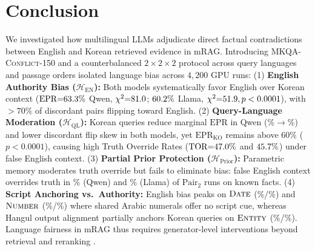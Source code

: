 \section{Conclusion}
\label{sec:conclusion}

We investigated how multilingual LLMs adjudicate direct factual contradictions between English and Korean retrieved evidence in mRAG. Introducing \textsc{MKQA-Conflict-150} and a counterbalanced $2 \times 2 \times 2$ protocol across query languages and passage orders isolated language bias across $4{,}200$ GPU runs: (1) \textbf{English Authority Bias ($\mathcal{H}_{\text{EN}}$):} Both models systematically favor English over Korean context ($\text{EPR}{=}63.3\%$ Qwen, $\chi^2{=}81.0$; $60.2\%$ Llama, $\chi^2{=}51.9, p <0.0001$), with $>70\%$ of discordant pairs flipping toward English. (2) \textbf{Query-Language Moderation ($\mathcal{H}_{\text{QL}}$):} Korean queries reduce marginal $\text{EPR}$ in Qwen (\qwenEPREN\%$\to$\qwenEPRKO\%) and lower discordant flip skew in both models, yet $\text{EPR}_{\text{KO}}$ remains above $60\%$ ($p < 0.0001$), causing high Truth Override Rates ($\text{TOR}{=}47.0\%$ and $45.7\%$) under false English context. (3) \textbf{Partial Prior Protection ($\mathcal{H}_{\text{Prior}}$):} Parametric memory moderates truth override but fails to eliminate bias: false English context overrides truth in \qwenPKKnownBothOverrideAll\% (Qwen) and \llamaPKKnownBothOverrideAll\% (Llama) of $\text{Pair}_2$ runs on known facts. (4) \textbf{Script Anchoring vs.\ Authority:} English bias peaks on $\textsc{Date}$ (\qwenCatDateEPRAll\%/\llamaCatDateEPRAll\%) and $\textsc{Number}$ (\qwenCatNumberEPRAll\%/\llamaCatNumberEPRAll\%) where shared Arabic numerals offer no script cue, whereas Hangul output alignment partially anchors Korean queries on $\textsc{Entity}$ (\qwenCatEntityEPRAll\%/\llamaCatEntityEPRAll\%). Language fairness in mRAG thus requires generator-level interventions beyond retrieval and reranking \citep{park2025investigating,wang2026languages}.
